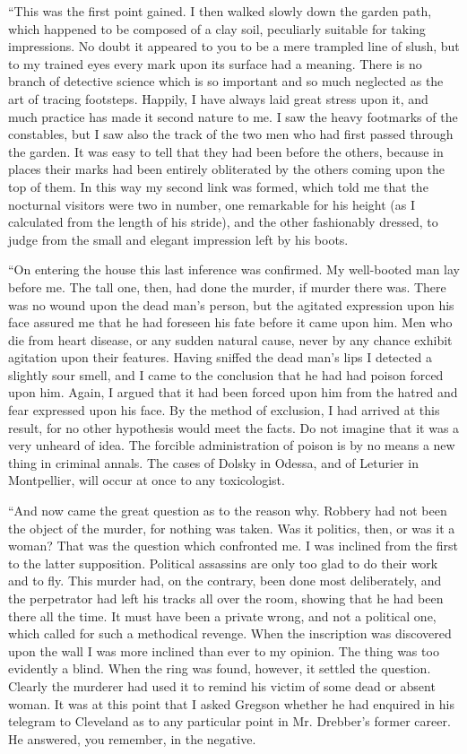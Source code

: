 \documentclass[12pt]{book}
\begin{document}
“This was the first point gained. I then walked slowly down the garden path, which happened to be composed of a clay soil, peculiarly suitable for taking impressions. No doubt it appeared to you to be a mere trampled line of slush, but to my trained eyes every mark upon its surface had a meaning. There is no branch of detective science which is so important and so much neglected as the art of tracing footsteps. Happily, I have always laid great stress upon it, and much practice has made it second nature to me. I saw the heavy footmarks of the constables, but I saw also the track of the two men who had first passed through the garden. It was easy to tell that they had been before the others, because in places their marks had been entirely obliterated by the others coming upon the top of them. In this way my second link was formed, which told me that the nocturnal visitors were two in number, one remarkable for his height (as I calculated from the length of his stride), and the other fashionably dressed, to judge from the small and elegant impression left by his boots. 

“On entering the house this last inference was confirmed. My well-booted man lay before me. The tall one, then, had done the murder, if murder there was. There was no wound upon the dead man’s person, but the agitated expression upon his face assured me that he had foreseen his fate before it came upon him. Men who die from heart disease, or any sudden natural cause, never by any chance exhibit agitation upon their features. Having sniffed the dead man’s lips I detected a slightly sour smell, and I came to the conclusion that he had had poison forced upon him. Again, I argued that it had been forced upon him from the hatred and fear expressed upon his face. By the method of exclusion, I had arrived at this result, for no other hypothesis would meet the facts. Do not imagine that it was a very unheard of idea. The forcible administration of poison is by no means a new thing in criminal annals. The cases of Dolsky in Odessa, and of Leturier in Montpellier, will occur at once to any toxicologist. 

“And now came the great question as to the reason why. Robbery had not been the object of the murder, for nothing was taken. Was it politics, then, or was it a woman? That was the question which confronted me. I was inclined from the first to the latter supposition. Political assassins are only too glad to do their work and to fly. This murder had, on the contrary, been done most deliberately, and the perpetrator had left his tracks all over the room, showing that he had been there all the time. It must have been a private wrong, and not a political one, which called for such a methodical revenge. When the inscription was discovered upon the wall I was more inclined than ever to my opinion. The thing was too evidently a blind. When the ring was found, however, it settled the question. Clearly the murderer had used it to remind his victim of some dead or absent woman. It was at this point that I asked Gregson whether he had enquired in his telegram to Cleveland as to any particular point in Mr. Drebber’s former career. He answered, you remember, in the negative. 
\end{document}

